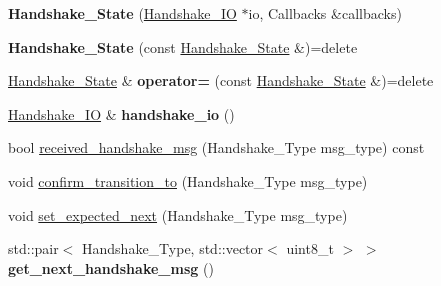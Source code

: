 \begin{DoxyCompactItemize}
\item 
\mbox{\label{class_botan_1_1_t_l_s_1_1_handshake___state_a0a34bb32296b3b2e62b9781c4ed22549}} 
{\bfseries Handshake\+\_\+\+State} (\mbox{\hyperlink{class_botan_1_1_t_l_s_1_1_handshake___i_o}{Handshake\+\_\+\+IO}} $\ast$io, Callbacks \&callbacks)
\item 
\mbox{\label{class_botan_1_1_t_l_s_1_1_handshake___state_a71c731834302798619c52f0a2e78bdb8}} 
{\bfseries Handshake\+\_\+\+State} (const \mbox{\hyperlink{class_botan_1_1_t_l_s_1_1_handshake___state}{Handshake\+\_\+\+State}} \&)=delete
\item 
\mbox{\label{class_botan_1_1_t_l_s_1_1_handshake___state_a22aff9e26fd993056694347781b275d2}} 
\mbox{\hyperlink{class_botan_1_1_t_l_s_1_1_handshake___state}{Handshake\+\_\+\+State}} \& {\bfseries operator=} (const \mbox{\hyperlink{class_botan_1_1_t_l_s_1_1_handshake___state}{Handshake\+\_\+\+State}} \&)=delete
\item 
\mbox{\label{class_botan_1_1_t_l_s_1_1_handshake___state_a806c11ab5bc0b4fef3344c0c411283ce}} 
\mbox{\hyperlink{class_botan_1_1_t_l_s_1_1_handshake___i_o}{Handshake\+\_\+\+IO}} \& {\bfseries handshake\+\_\+io} ()
\item 
bool \mbox{\hyperlink{class_botan_1_1_t_l_s_1_1_handshake___state_ae7eb930bfe4e17f0e28da8e34159bb3d}{received\+\_\+handshake\+\_\+msg}} (Handshake\+\_\+\+Type msg\+\_\+type) const
\item 
void \mbox{\hyperlink{class_botan_1_1_t_l_s_1_1_handshake___state_aac3a4338494a5f63d72e419fbadd2b8f}{confirm\+\_\+transition\+\_\+to}} (Handshake\+\_\+\+Type msg\+\_\+type)
\item 
void \mbox{\hyperlink{class_botan_1_1_t_l_s_1_1_handshake___state_a22101cce723f09aaa6b0bfa8ff526f7a}{set\+\_\+expected\+\_\+next}} (Handshake\+\_\+\+Type msg\+\_\+type)
\item 
\mbox{\label{class_botan_1_1_t_l_s_1_1_handshake___state_a163ab1f516d977a175a56cbaa8878a41}} 
std\+::pair$<$ Handshake\+\_\+\+Type, std\+::vector$<$ uint8\+\_\+t $>$ $>$ {\bfseries get\+\_\+next\+\_\+handshake\+\_\+msg} ()

\end{DoxyCompactItemize}
